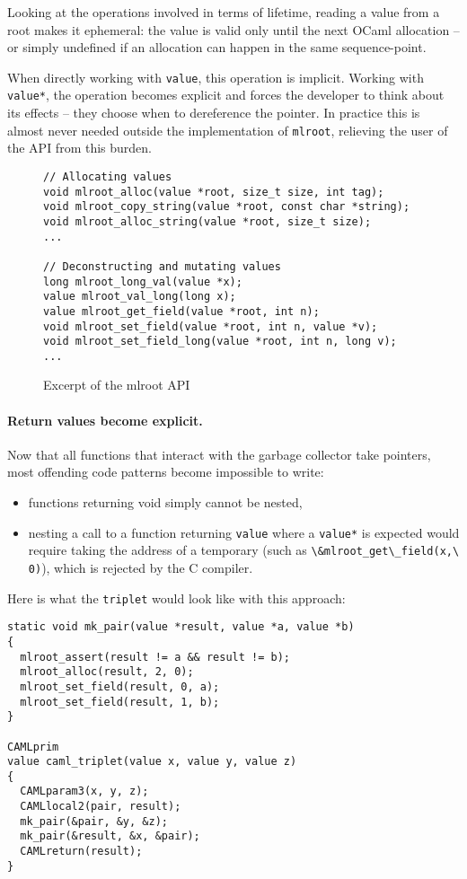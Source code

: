 \documentclass[a4paper]{easychair}
\newcommand{\cpp}[1]{\lstinline[style=C++]{#1}}
\begin{document}
Looking at the operations involved in terms of lifetime, reading a value
from a root makes it ephemeral: the value is valid only until the next
OCaml allocation -- or simply undefined if an allocation can happen in
the same sequence-point.

When directly working with \cpp{value}, this operation is implicit.
Working with \cpp{value*}, the operation becomes explicit and forces
the developer to think about its effects -- they choose when to
dereference the pointer.
In practice this is almost never needed outside the implementation of
\cpp{mlroot}, relieving the user of the API from this burden.

\begin{figure}[htbp]
\begin{lstlisting}[style=C++]
// Allocating values
void mlroot_alloc(value *root, size_t size, int tag);
void mlroot_copy_string(value *root, const char *string);
void mlroot_alloc_string(value *root, size_t size);
...
    
// Deconstructing and mutating values
long mlroot_long_val(value *x);
value mlroot_val_long(long x);
value mlroot_get_field(value *root, int n);
void mlroot_set_field(value *root, int n, value *v);
void mlroot_set_field_long(value *root, int n, long v);
...
\end{lstlisting}
  \caption{Excerpt of the mlroot API}
  \label{fig:mlroot}
\end{figure}

\paragraph{Return values become explicit.}

Now that all functions that interact with the garbage collector take
pointers, most offending code patterns become impossible to write:
%
\begin{itemize}
\item functions returning void simply cannot be nested,
\item nesting a call to a function returning \cpp{value} where a
      \cpp{value*} is expected would require taking the address of a
      temporary (such as \cpp{\&mlroot_get\_field(x,\ 0)}), which is rejected by the C
      compiler.
\end{itemize}

Here is what the \cpp{triplet} would look like with this approach:
%
\begin{lstlisting}[style=C++]
static void mk_pair(value *result, value *a, value *b)
{
  mlroot_assert(result != a && result != b);
  mlroot_alloc(result, 2, 0);
  mlroot_set_field(result, 0, a);
  mlroot_set_field(result, 1, b);
}

CAMLprim
value caml_triplet(value x, value y, value z)
{
  CAMLparam3(x, y, z);
  CAMLlocal2(pair, result);
  mk_pair(&pair, &y, &z);
  mk_pair(&result, &x, &pair);
  CAMLreturn(result);
}
\end{lstlisting}
\end{document}

